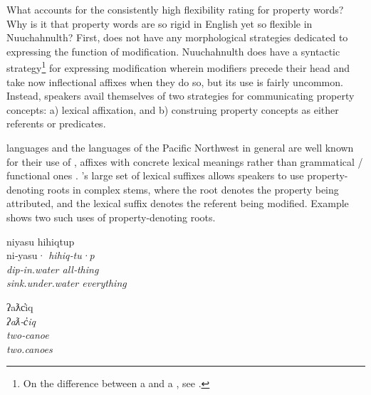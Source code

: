 What accounts for the consistently high flexibility rating for property words? Why is it that property words are so rigid in English yet so flexible in Nuuchahnulth? First,  does not have any morphological strategies dedicated to expressing the function of modification. Nuuchahnulth does have a syntactic strategy\footnote{On the difference between a  and a , see \textcites[537]{Croft2014}[380]{Croft2016}.} for expressing modification wherein modifiers precede their head and take now inflectional affixes when they do so, but its use is fairly uncommon. Instead, speakers avail themselves of two strategies for communicating property concepts: a) lexical affixation, and b) construing property concepts as either referents or predicates.

 languages and the languages of the Pacific Northwest in general are well known for their use of , affixes with concrete lexical meanings rather than grammatical / functional ones \parencite{Mithun1997}. 's large set of lexical suffixes allows speakers to use property-denoting roots in complex stems, where the root denotes the property being attributed, and the lexical suffix denotes the referent being modified. Example  shows two such uses of property-denoting roots.

\begin{exe}
  \ex\label{ex:4.1}
  \begin{xlist}

    \ex\label{ex:4.1a}
    \gllll niyasu           hihiqtup\\
           ni‑yasu·         \em{hihiq}‑tu·p\\
           dip‑in.water     \em{all}‑thing\\
           sink.under.water everything\\

    \ex\label{ex:4.1b}
    \gllll ʔaƛc̓iq\\
           \em{ʔaƛ}‑c̓iq\\
           \em{two}‑canoe\\
           two.canoes\\

  \end{xlist}
\end{exe}

